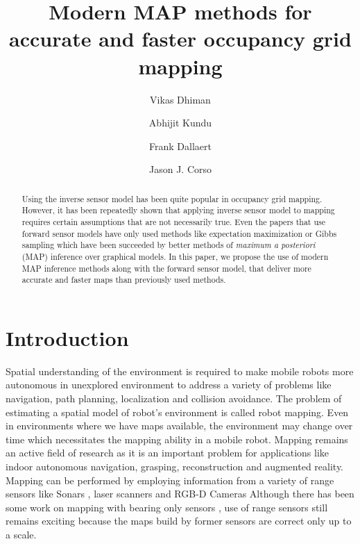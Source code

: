 \documentclass[letterpaper, 10 pt, conference]{ieeeconf} %
\title{\Large \bf
Modern MAP methods for accurate and faster occupancy grid mapping
}
\author[1]{Vikas Dhiman}
\author[2]{Abhijit Kundu}
\author[2]{Frank Dallaert}
\author[1]{Jason J. Corso}
\affil[1]{{\tt\small\{vikasdhi,jcorso\}@buffalo.edu}}
\affil[1]{ Department of Computer Science and Engineering, SUNY at Buffalo, NY, USA }
\affil[2]{{\tt\small\{abhijit.kundu,frank\}@gatech.edu}}
\affil[2]{College of Computing, Georgia Tech, GA, USA}
\begin{document}
\maketitle
\begin{abstract}
  Using the inverse sensor model has been quite popular in occupancy grid mapping.
  However, it has been repeatedly shown \cite{thrun2003learning,merali2013icra} 
  that applying inverse sensor model to mapping requires certain
  assumptions that are not necessarily true. Even the papers that use forward 
  sensor models have only used methods like expectation maximization
  or Gibbs sampling which have been succeeded by better methods of
  \emph{maximum a posteriori} (MAP) inference over graphical models.
  In this paper, we propose the use of modern MAP inference methods along with
  the forward sensor model, that deliver more accurate and faster maps than
  previously used methods.
\end{abstract}
\section{Introduction}

Spatial understanding of the environment is required to make mobile robots more
autonomous in unexplored environment to address a variety of problems like
navigation, path planning, localization and collision avoidance. 
The problem of estimating a spatial model of robot's
environment is called robot mapping\cite{thrun2002robotic}. Even in
environments where we have maps available, the environment may change over time
which necessitates the mapping ability in a mobile robot.
Mapping remains an active field of research \cite{meyer2012occupancy,nagla2012improved,merali2013icra}
as it is an important problem for
applications like indoor autonomous navigation, grasping, reconstruction and
augmented reality.
Mapping can be performed by employing information from a variety of range
sensors like Sonars \cite{thrun2003learning}, laser scanners \cite{merali2013icra}
and RGB-D Cameras \cite{newcombe2011kinectfusion}
Although there has been some work on mapping with bearing only sensors
\cite{davison2007monoslam,kundu2011realtime}, use of range sensors still
remains exciting because the maps build by former sensors are correct only up
to a scale.
\end{document}
